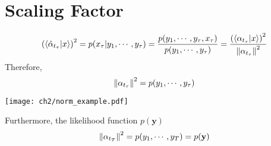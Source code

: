 \section{Scaling Factor}
\begin{definition}
\begin{equation}
        \left(\left< \hat{\alpha}_{t_{\tau}} | x \right>\right)^2 = p(x_{\tau}|y_1,\cdots,y_{\tau})  = 
        \frac{p(y_1,\cdots,y_{\tau}, x_{\tau})}{p(y_1,\cdots,y_{\tau})} =
        \frac{\left(\left< \alpha_{t_{\tau}} | x \right>\right)^2}{\left\lVert\alpha_{t_{\tau}}\right\rVert^2} 
\end{equation}
Therefore,
\begin{equation}
        \left\lVert\alpha_{t_{\tau}}\right\rVert^2 = p(y_1,\cdots,y_{\tau}) 
\end{equation}
\begin{center}
        \texttt{[image: ch2/norm\_example.pdf]}
\end{center}
Furthermore, the likelihood function $p(\textbf{y})$
\begin{equation}
        \left\lVert\alpha_{t_{T}}\right\rVert^2 =  p(y_1,\cdots,y_T) = p(\textbf{y})
\end{equation}
\end{definition}

